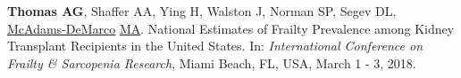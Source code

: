 \documentclass[10pt]{article}
\makeatletter
\newlength{\bibhang}
\newlength{\bibsep}
 {\@listi \global\bibsep\itemsep \global\advance\bibsep by\parsep}
\newenvironment{bibenum*}
  {\renewcommand\labelenumi{[\theenumi]}%
   \etaremune[
     topsep=0pt,
     itemsep=\bibsep,
     parsep=0pt,partopsep=0pt,
     itemindent=-\bibhang,
     leftmargin={\bibhang+\widthof{[999]}}]}
  {\endetaremune}
\makeatother
\begin{document}
\begin{bibenum*}


\item \textbf{Thomas AG}, Shaffer AA, Ying H, Walston J,
  Norman SP, Segev DL, \underline{McAdams-DeMarco} \underline{MA}.
  National Estimates of Frailty Prevalence among Kidney
  Transplant Recipients in the United States.
  In: \emph{International Conference on Frailty \& Sarcopenia Research},
  Miami Beach, FL, USA, March 1 - 3, 2018.






\end{bibenum*}
\end{document}
